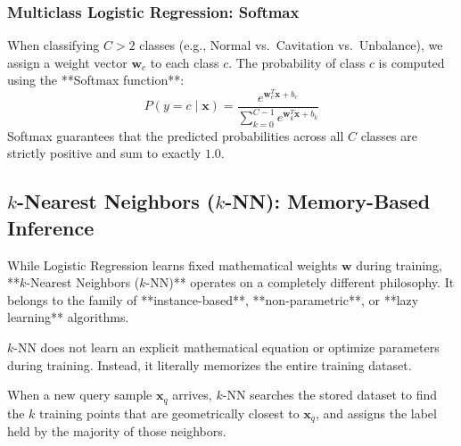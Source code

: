 \subsubsection{Multiclass Logistic Regression: Softmax}
When classifying $C > 2$ classes (e.g., Normal vs.\ Cavitation vs.\ Unbalance), we assign a weight vector $\mathbf{w}_c$ to each class $c$. The probability of class $c$ is computed using the **Softmax function**:
\begin{equation}
P(y = c \mid \mathbf{x}) = \frac{e^{\mathbf{w}_c^T \mathbf{x} + b_c}}{\sum_{k=0}^{C-1} e^{\mathbf{w}_k^T \mathbf{x} + b_k}}\label{eq:softmax_equation}
\end{equation}
Softmax guarantees that the predicted probabilities across all $C$ classes are strictly positive and sum to exactly $1.0$.

\subsection{$k$-Nearest Neighbors ($k$-NN): Memory-Based Inference}\label{subsec:knn}

While Logistic Regression learns fixed mathematical weights $\mathbf{w}$ during training, **$k$-Nearest Neighbors ($k$-NN)** operates on a completely different philosophy. It belongs to the family of **instance-based**, **non-parametric**, or **lazy learning** algorithms.

\begin{keyidea}
$k$-NN does not learn an explicit mathematical equation or optimize parameters during training. Instead, it literally memorizes the entire training dataset. 

When a new query sample $\mathbf{x}_q$ arrives, $k$-NN searches the stored dataset to find the $k$ training points that are geometrically closest to $\mathbf{x}_q$, and assigns the label held by the majority of those neighbors.
\end{keyidea}


